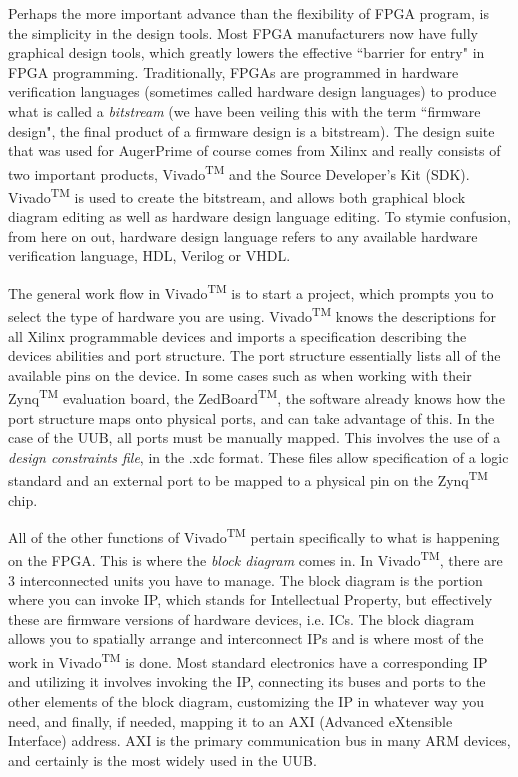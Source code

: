 Perhaps the more important advance than the flexibility of FPGA program, is the simplicity in the design tools. Most FPGA manufacturers now have fully graphical design tools, which greatly lowers the effective ``barrier for entry" in FPGA programming. Traditionally, FPGAs are programmed in hardware verification languages (sometimes called hardware design languages) to produce what is called a \textit{bitstream} (we have been veiling this with the term ``firmware design", the final product of a firmware design is a bitstream). The design suite that was used for AugerPrime of course comes from Xilinx and really consists of two important products, Vivado\textsuperscript{TM} and the Source Developer's Kit (SDK). Vivado\textsuperscript{TM} is used to create the bitstream, and allows both graphical block diagram editing as well as hardware design language editing. To stymie confusion, from here on out, hardware design language refers to any available hardware verification language, HDL, Verilog or VHDL. 

The general work flow in Vivado\textsuperscript{TM} is to start a project, which prompts you to select the type of hardware you are using. Vivado\textsuperscript{TM} knows the descriptions for all Xilinx programmable devices and imports a specification describing the devices abilities and port structure. The port structure essentially lists all of the available pins on the device. In some cases such as when working with their Zynq\textsuperscript{TM} evaluation board, the ZedBoard\textsuperscript{TM}, the software already knows how the port structure maps onto physical ports, and can take advantage of this. In the case of the UUB, all ports must be manually mapped. This involves the use of a \textit{design constraints file}, in the .xdc format. These files allow specification of a logic standard and an external port to be mapped to a physical pin on the Zynq\textsuperscript{TM} chip.

All of the other functions of Vivado\textsuperscript{TM} pertain specifically to what is happening on the FPGA. This is where the \textit{block diagram} comes in. In Vivado\textsuperscript{TM}, there are 3 interconnected units you have to manage. The block diagram is the portion where you can invoke IP, which stands for Intellectual Property, but effectively these are firmware versions of hardware devices, i.e. ICs. The block diagram allows you to spatially arrange and interconnect IPs and is where most of the work in Vivado\textsuperscript{TM} is done. Most standard electronics have a corresponding IP and utilizing it involves invoking the IP, connecting its buses and ports to the other elements of the block diagram, customizing the IP in whatever way you need, and finally, if needed, mapping it to an AXI (Advanced eXtensible Interface) address. AXI is the primary communication bus in many ARM devices, and certainly is the most widely used in the UUB. 

